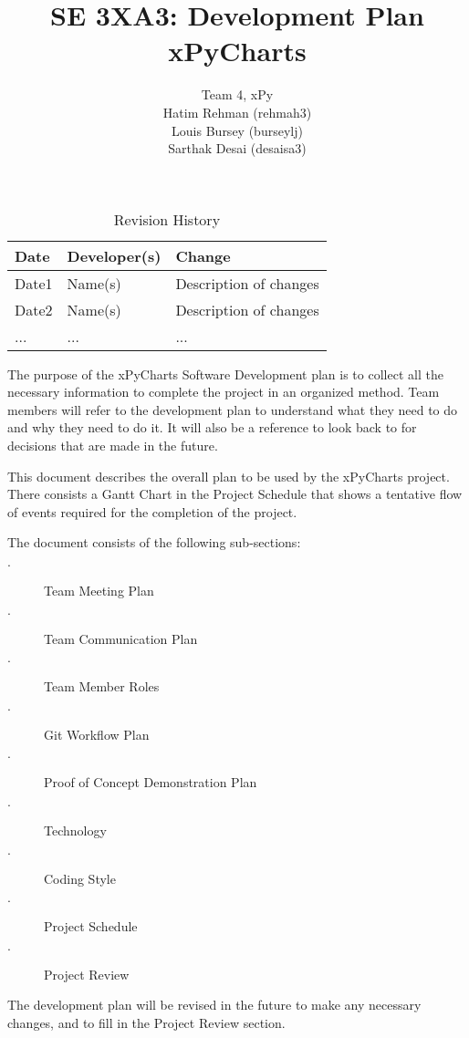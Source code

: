 \documentclass{article}
\title{SE 3XA3: Development Plan\\xPyCharts}
\author{Team 4, xPy
		\\ Hatim Rehman (rehmah3)
		\\ Louis Bursey (burseylj)
		\\ Sarthak Desai (desaisa3)
}
\date{}
\begin{document}
\begin{table}[hp]
\caption{Revision History} \label{TblRevisionHistory}
\begin{tabularx}{\textwidth}{llX}
\toprule
\textbf{Date} & \textbf{Developer(s)} & \textbf{Change}\\
\midrule
Date1 & Name(s) & Description of changes\\
Date2 & Name(s) & Description of changes\\
... & ... & ...\\
\bottomrule
\end{tabularx}
\end{table}

\newpage

\maketitle

The purpose of the xPyCharts Software Development plan is to collect all the necessary information to complete the project in an organized method. Team members will refer to the development plan to understand what they need to do and why they need to do it. It will also be a reference to look back to for decisions that are made in the future. 

This document describes the overall plan to be used by the xPyCharts project. There consists a Gantt Chart in the Project Schedule that shows a tentative flow of events required for the completion of the project.

The document consists of the following sub-sections:
\begin{description}
  \item[$\cdot$] Team Meeting Plan
  \item[$\cdot$] Team Communication Plan
  \item[$\cdot$] Team Member Roles
  \item[$\cdot$] Git Workflow Plan
  \item[$\cdot$] Proof of Concept Demonstration Plan
  \item[$\cdot$] Technology
  \item[$\cdot$] Coding Style
  \item[$\cdot$] Project Schedule
  \item[$\cdot$] Project Review
  
\end{description}

The development plan will be revised in the future to make any necessary changes, and to fill in the Project Review section. 
\end{document}
